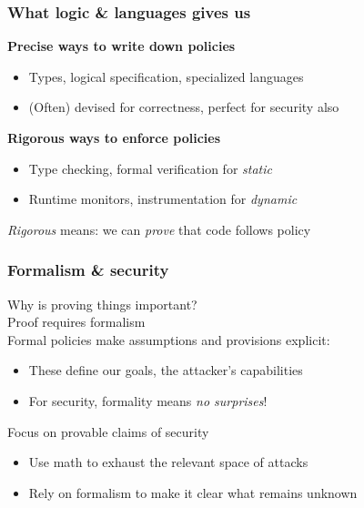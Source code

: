 \documentclass[10pt]{beamer}
\begin{document}

\begin{frame}

\frametitle{What logic \& languages gives us}

\textbf{Precise ways to write down policies} \pause
\begin{itemize}
  \item Types, logical specification, specialized languages
  \item (Often) devised for correctness, perfect for security also \\[1em]
\end{itemize}

\pause
\textbf{Rigorous ways to enforce policies}
\begin{itemize}
  \item Type checking, formal verification for \emph{static}
  \item Runtime monitors, instrumentation for \emph{dynamic} \\[1em]
\end{itemize}

\pause
\emph{Rigorous} means: we can \emph{prove} that code follows policy

\end{frame}


\begin{frame}

\frametitle{Formalism \& security}

Why is proving things important?
\\[1em]

\pause
Proof requires formalism
\\[1em]

\pause
Formal policies make assumptions and provisions explicit:
\begin{itemize}
  \item These define our goals, the attacker's capabilities
  \item For security, formality means \emph{no surprises}! \\[1em]
\end{itemize}

\pause
Focus on provable claims of security
\begin{itemize}
  \item Use math to exhaust the relevant space of attacks
  \item Rely on formalism to make it clear what remains unknown
\end{itemize}


\end{frame}
\end{document}
